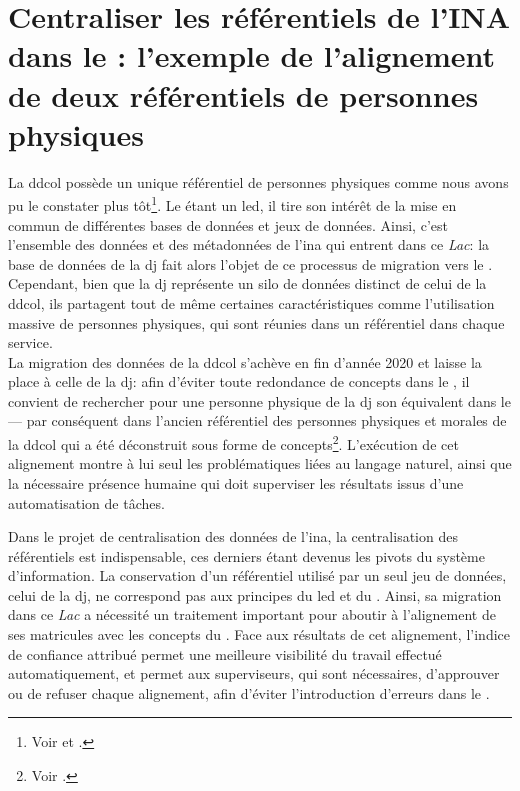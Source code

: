 \chapter{\label{III-C}Centraliser les référentiels de l’INA dans le \ldd: l'exemple de l'alignement de deux référentiels de personnes physiques}

La \ac{ddcol} possède un unique référentiel de personnes physiques comme nous avons pu le constater plus tôt\footnote{Voir  et .}. Le \ldd étant un \ac{led}, il tire son intérêt de la mise en commun de différentes bases de données et jeux de données. Ainsi, c'est l'ensemble des données et des métadonnées de l'\ac{ina} qui entrent dans ce \textit{Lac}: la base de données de la \ac{dj} fait alors l'objet de ce processus de migration vers le \ldd. Cependant, bien que la \ac{dj} représente un silo de données distinct de celui de la \ac{ddcol}, ils partagent tout de même certaines caractéristiques comme l'utilisation massive de personnes physiques, qui sont réunies dans un référentiel dans chaque service.\\

La migration des données de la \ac{ddcol} s'achève en fin d'année 2020 et laisse la place à celle de la \ac{dj}: afin d'éviter toute redondance de concepts dans le \ldd, il convient de rechercher pour une personne physique de la \ac{dj} son équivalent dans le \ldd --- par conséquent dans l'ancien référentiel des personnes physiques et morales de la \ac{ddcol} qui a été déconstruit sous forme de concepts\footnote{Voir .}. L'exécution de cet alignement montre à lui seul les problématiques liées au langage naturel, ainsi que la nécessaire présence humaine qui doit superviser les résultats issus d'une automatisation de tâches.





\bigskip
\bigskip
Dans le projet de centralisation des données de l'\ac{ina}, la centralisation des référentiels est indispensable, ces derniers étant devenus les pivots du système d'information. La conservation d'un référentiel utilisé par un seul jeu de données, celui de la \ac{dj}, ne correspond pas aux principes du \ac{led} et du \ldd. Ainsi, sa migration dans ce \textit{Lac} a nécessité un traitement important pour aboutir à l'alignement de ses matricules avec les concepts du \ldd. Face aux résultats de cet alignement, l'indice de confiance attribué permet une meilleure visibilité du travail effectué automatiquement, et permet aux superviseurs, qui sont nécessaires, d'approuver ou de refuser chaque alignement, afin d'éviter l'introduction d'erreurs dans le \ldd.